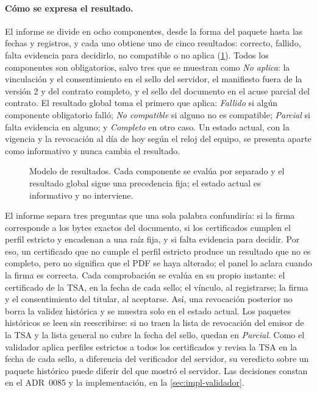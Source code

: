 \paragraph{Cómo se expresa el resultado.} El informe se divide en ocho componentes, desde la forma del paquete hasta las fechas y registros, y cada uno obtiene uno de cinco resultados: correcto, fallido, falta evidencia para decidirlo, no compatible o no aplica (\cref{fig:cripto-validador-resultados}). Todos los componentes son obligatorios, salvo tres que se muestran como \emph{No aplica}: la vinculación y el consentimiento en el sello del servidor, el manifiesto fuera de la versión 2 y del contrato completo, y el sello del documento en el acuse parcial del contrato. El resultado global toma el primero que aplica: \emph{Fallido} si algún componente obligatorio falló; \emph{No compatible} si alguno no es compatible; \emph{Parcial} si falta evidencia en alguno; y \emph{Completo} en otro caso. Un estado actual, con la vigencia y la revocación al día de hoy según el reloj del equipo, se presenta aparte como informativo y nunca cambia el resultado.

\begin{figure}[!htbp]
  \centering
  
  \caption{Modelo de resultados. Cada componente se evalúa por separado y el resultado global sigue una precedencia fija; el estado actual es informativo y no interviene.}
  \label{fig:cripto-validador-resultados}
\end{figure}

El informe separa tres preguntas que una sola palabra confundiría: si la firma corresponde a los bytes exactos del documento, si los certificados cumplen el perfil estricto y encadenan a una raíz fija, y si falta evidencia para decidir. Por eso, un certificado que no cumple el perfil estricto produce un resultado que no es completo, pero no significa que el PDF se haya alterado; el panel lo aclara cuando la firma es correcta. Cada comprobación se evalúa en su propio instante: el certificado de la TSA, en la fecha de cada sello; el vínculo, al registrarse; la firma y el consentimiento del titular, al aceptarse. Así, una revocación posterior no borra la validez histórica y se muestra solo en el estado actual. Los paquetes históricos se leen sin reescribirse: si no traen la lista de revocación del emisor de la TSA y la lista general no cubre la fecha del sello, quedan en \emph{Parcial}. Como el validador aplica perfiles estrictos a todos los certificados y revisa la TSA en la fecha de cada sello, a diferencia del verificador del servidor, su veredicto sobre un paquete histórico puede diferir del que mostró el servidor. Las decisiones constan en el ADR~0085 y la implementación, en la \cref{sec:impl-validador}.

